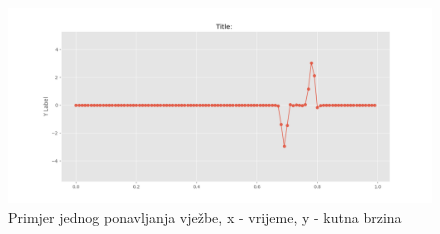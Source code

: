 \documentclass[times, utf8, diplomski]{fer}
\begin{document}
\begin{figure}[h!]
    \includegraphics[width=\textwidth]{period.png}
    \caption{Primjer jednog ponavljanja vježbe, x - vrijeme, y - kutna brzina}
    \label{period}
\end{figure}
\end{document}
